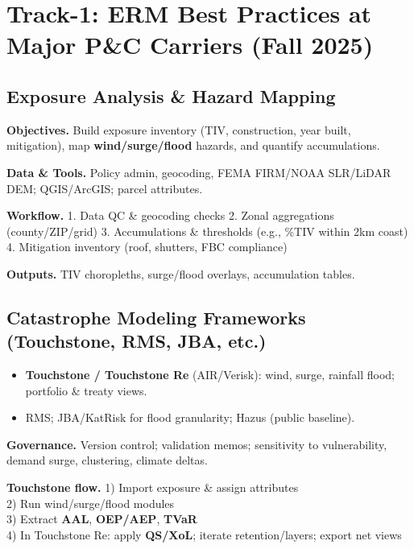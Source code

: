 \documentclass[
  letterpaper,
]{scrbook}
\providecommand{\tightlist}{%
  \setlength{\itemsep}{0pt}\setlength{\parskip}{0pt}}\usepackage{longtable,booktabs,array}
\begin{document}
\part{Track-1: ERM Best Practices at Major P\&C Carriers (Fall 2025)}

\chapter{Exposure Analysis \& Hazard
Mapping}\label{exposure-analysis-hazard-mapping}

\textbf{Objectives.} Build exposure inventory (TIV, construction, year
built, mitigation), map \textbf{wind/surge/flood} hazards, and quantify
accumulations.

\textbf{Data \& Tools.} Policy admin, geocoding, FEMA FIRM/NOAA
SLR/LiDAR DEM; QGIS/ArcGIS; parcel attributes.

\textbf{Workflow.} 1. Data QC \& geocoding checks 2. Zonal aggregations
(county/ZIP/grid) 3. Accumulations \& thresholds (e.g., \%TIV within 2km
coast) 4. Mitigation inventory (roof, shutters, FBC compliance)

\textbf{Outputs.} TIV choropleths, surge/flood overlays, accumulation
tables.

\chapter{Catastrophe Modeling Frameworks (Touchstone, RMS, JBA,
etc.)}\label{catastrophe-modeling-frameworks-touchstone-rms-jba-etc.}

\begin{itemize}
\tightlist
\item
  \textbf{Touchstone / Touchstone Re} (AIR/Verisk): wind, surge,
  rainfall flood; portfolio \& treaty views.
\item
  RMS; JBA/KatRisk for flood granularity; Hazus (public baseline).
\end{itemize}

\textbf{Governance.} Version control; validation memos; sensitivity to
vulnerability, demand surge, clustering, climate deltas.

\textbf{Touchstone flow.} 1) Import exposure \& assign attributes\\
2) Run wind/surge/flood modules\\
3) Extract \textbf{AAL}, \textbf{OEP/AEP}, \textbf{TVaR}\\
4) In Touchstone Re: apply \textbf{QS/XoL}; iterate retention/layers;
export net views
\end{document}
